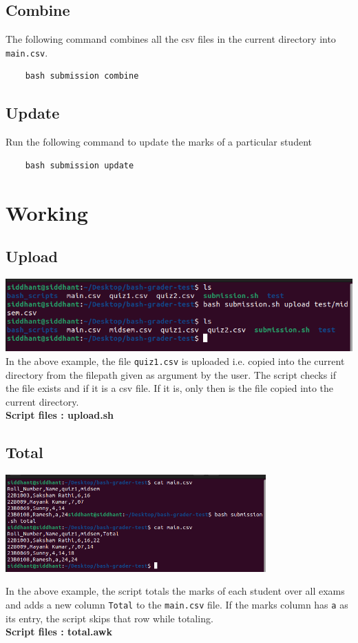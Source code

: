 \documentclass{article}
\begin{document}
\subsection{Combine}
The following command combines all the csv files in the current directory into \verb"main.csv".
\begin{Verbatim}
    bash submission combine
\end{Verbatim}


\subsection{Update}
Run the following command to update the marks of a particular student
\begin{verbatim}
    bash submission update
\end{verbatim}

\newpage

\section{Working}
\subsection{Upload}
\includegraphics[width=\textwidth]{upload.png}
In the above example, the file \verb"quiz1.csv" is uploaded i.e. copied into the current directory from the filepath given as argument by the user.
The script checks if the file exists and if it is a csv file. If it is, only then is the file copied into the current directory.\\
\textbf{Script files : upload.sh }


\subsection{Total}
\begin{center}
    \includegraphics[width=10cm]{total.png}
\end{center}
In the above example, the script totals the marks of each student over all exams and adds a new column \verb"Total" to the \verb"main.csv" file.
If the marks column has \verb"a" as its entry, the script skips that row while totaling.\\
\textbf{Script files : total.awk }
\end{document}
